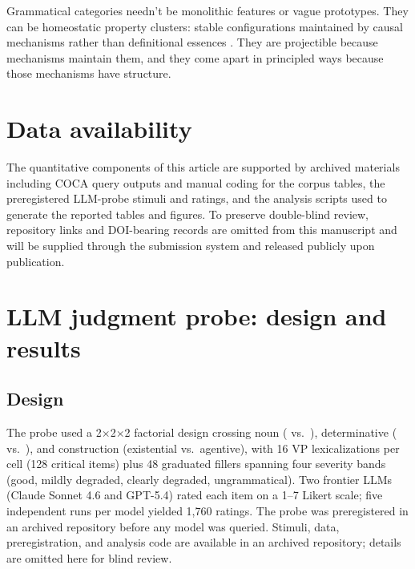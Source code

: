 \documentclass[12pt,a4paper]{article}
\begin{document}
Grammatical categories needn't be monolithic features or vague prototypes. They can be homeostatic property clusters: stable configurations maintained by causal mechanisms rather than definitional essences \citep{reynolds2025stack,reynolds2025definiteness}. They are projectible because mechanisms maintain them, and they come apart in principled ways because those mechanisms have structure.

\section*{Data availability}

The quantitative components of this article are supported by archived materials including COCA query outputs and manual coding for the corpus tables, the preregistered LLM-probe stimuli and ratings, and the analysis scripts used to generate the reported tables and figures. To preserve double-blind review, repository links and DOI-bearing records are omitted from this manuscript and will be supplied through the submission system and released publicly upon publication.

\clearpage
\appendix

\section{LLM judgment probe: design and results}\label{app:probe}

\subsection*{Design}

The probe used a 2$\times$2$\times$2 factorial design crossing noun ( vs.\ ), determinative ( vs.\ ), and construction (existential vs.\ agentive), with 16 VP lexicalizations per cell (128 critical items) plus 48 graduated fillers spanning four severity bands (good, mildly degraded, clearly degraded, ungrammatical). Two frontier LLMs (Claude Sonnet 4.6 and GPT-5.4) rated each item on a 1--7 Likert scale; five independent runs per model yielded 1{,}760 ratings. The probe was preregistered in an archived repository before any model was queried. Stimuli, data, preregistration, and analysis code are available in an archived repository; details are omitted here for blind review.
\end{document}
